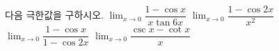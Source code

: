 다음 극한값을 구하시오.
 $\displaystyle\lim_{x\to 0}\dfrac{1-\cos x}{x\tan 6x}$
 $\displaystyle\lim_{x\to 0}\dfrac{1-\cos 2x}{x^2}$
 $\displaystyle\lim_{x\to 0}\dfrac{1-\cos x}{1-\cos 2x}$
 $\displaystyle\lim_{x\to 0}\dfrac{\csc x-\cot x}{x}$
